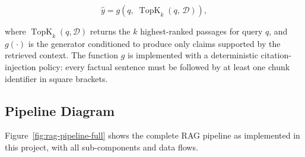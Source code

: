 \begin{equation}
\label{eq:rag-def}
\hat{y} = g\!\left(q,\;\operatorname{TopK}_k\!\left(q,\,\mathcal{D}\right)\right),
\end{equation}

where $\operatorname{TopK}_k(q, \mathcal{D})$ returns the $k$ highest-ranked
passages for query $q$, and $g(\cdot)$ is the generator conditioned to produce
only claims supported by the retrieved context. The function $g$ is implemented
with a deterministic citation-injection policy: every factual sentence must be
followed by at least one chunk identifier in square brackets.

\subsection{Pipeline Diagram}
\label{sec:rag-pipeline-diag}

Figure~\ref{fig:rag-pipeline-full} shows the complete RAG pipeline as implemented
in this project, with all sub-components and data flows.

